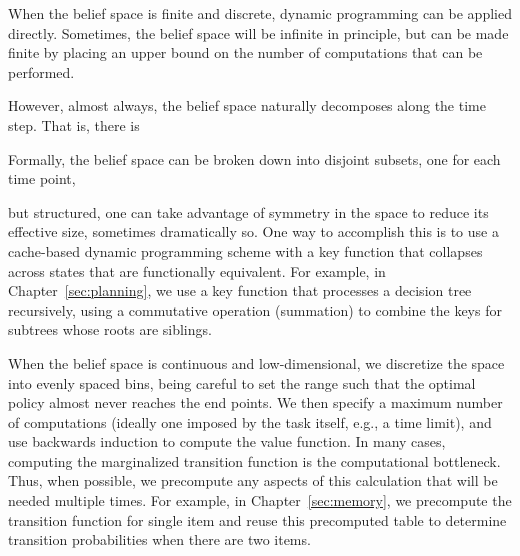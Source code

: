 
When the belief space is finite and discrete, dynamic programming can be applied directly. Sometimes, the belief space will be infinite in principle, but can be made finite by placing an upper bound on the number of computations that can be performed.





However, almost always, the belief space naturally decomposes along the time step. That is, there is 

Formally, the belief space can be broken down into disjoint subsets, one for each time point,

but structured, one can take advantage of symmetry in the space to reduce its effective size, sometimes dramatically so. One way to accomplish this is to use a cache-based dynamic programming scheme with a key function that collapses across states that are functionally equivalent. For example, in Chapter~\ref{sec:planning}, we use a key function that processes a decision tree recursively, using a commutative operation (summation) to combine the keys for subtrees whose roots are siblings.

When the belief space is continuous and low-dimensional, we discretize the space into evenly spaced bins, being careful to set the range such that the optimal policy almost never reaches the end points. We then specify a maximum number of computations (ideally one imposed by the task itself, e.g., a time limit), and use backwards induction to compute the value function. In many cases, computing the marginalized transition function is the computational bottleneck. Thus, when possible, we precompute any aspects of this calculation that will be needed multiple times. For example, in Chapter~\ref{sec:memory}, we precompute the transition function for single item and reuse this precomputed table to determine transition probabilities when there are two items.


